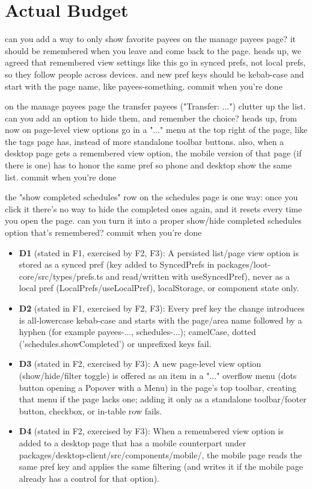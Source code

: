 \section{Actual Budget}
\begin{description}[style=nextline, nosep, leftmargin=1.2em]
\item[F1 (5 code, 2 stated checks)] \small can you add a way to only show favorite payees on the manage payees page? it should be remembered when you leave and come back to the page. heads up, we agreed that remembered view settings like this go in synced prefs, not local prefs, so they follow people across devices. and new pref keys should be kebab-case and start with the page name, like payees-something. commit when you're done
\item[F2 (3 code, 2 stated, 2 carried, 1 leak checks)] \small on the manage payees page the transfer payees ("Transfer: ...") clutter up the list. can you add an option to hide them, and remember the choice? heads up, from now on page-level view options go in a "..." menu at the top right of the page, like the tags page has, instead of more standalone toolbar buttons. also, when a desktop page gets a remembered view option, the mobile version of that page (if there is one) has to honor the same pref so phone and desktop show the same list. commit when you're done
\item[F3 (4 code, 4 carried, 1 leak checks)] \small the "show completed schedules" row on the schedules page is one way: once you click it there's no way to hide the completed ones again, and it resets every time you open the page. can you turn it into a proper show/hide completed schedules option that's remembered? commit when you're done
\end{description}
\begin{itemize}[nosep]
\item \textbf{D1} (stated in F1, exercised by F2, F3): A persisted list/page view option is stored as a synced pref (key added to SyncedPrefs in packages/loot-core/src/types/prefs.ts and read/written with useSyncedPref), never as a local pref (LocalPrefs/useLocalPref), localStorage, or component state only.
\item \textbf{D2} (stated in F1, exercised by F2, F3): Every pref key the change introduces is all-lowercase kebab-case and starts with the page/area name followed by a hyphen (for example payees-..., schedules-...); camelCase, dotted ('schedules.showCompleted') or unprefixed keys fail.
\item \textbf{D3} (stated in F2, exercised by F3): A new page-level view option (show/hide/filter toggle) is offered as an item in a "..." overflow menu (dots button opening a Popover with a Menu) in the page's top toolbar, creating that menu if the page lacks one; adding it only as a standalone toolbar/footer button, checkbox, or in-table row fails.
\item \textbf{D4} (stated in F2, exercised by F3): When a remembered view option is added to a desktop page that has a mobile counterpart under packages/desktop-client/src/components/mobile/, the mobile page reads the same pref key and applies the same filtering (and writes it if the mobile page already has a control for that option).
\end{itemize}
